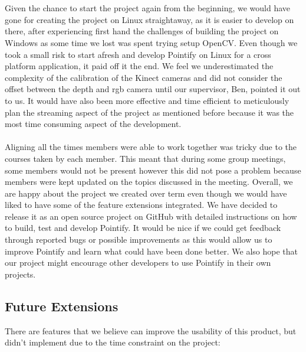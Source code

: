 \documentclass{article}
\begin{document}
\\\\
Given the chance to start the project again from the beginning, we would have gone for creating the project on Linux straightaway, as it is easier to develop on there, after experiencing first hand the challenges of building the project on Windows as some time we lost was spent trying setup OpenCV. Even though we took a small risk to start afresh and develop Pointify on Linux for a cross platform application, it paid off it the end. We feel we underestimated the complexity of the calibration of the Kinect cameras and did not consider the offset between the depth and rgb camera until our supervisor, Ben, pointed it out to us. It would have also been more effective and time efficient to meticulously plan the streaming aspect of the project as mentioned before because it was the most time consuming aspect of the development.
\\\\
Aligning all the times members were able to work together was tricky due to the courses taken by each member. This meant that during some group meetings, some members would not be present however this did not pose a problem because members were kept updated on the topics discussed in the meeting. Overall, we are happy about the project we created over term even though we would have liked to have some of the feature extensions integrated. We have decided to release it as an open source project on GitHub with detailed instructions on how to build, test and develop Pointify. It would be nice if we could get feedback through reported bugs or possible improvements as this would allow us to improve Pointify and learn what could have been done better. We also hope that our project might encourage other developers to use Pointify in their own projects. 
\newpage
\subsection{Future Extensions}
There are features that we believe can improve the usability of this product, but didn't implement due to the time constraint on the project:
\end{document}
